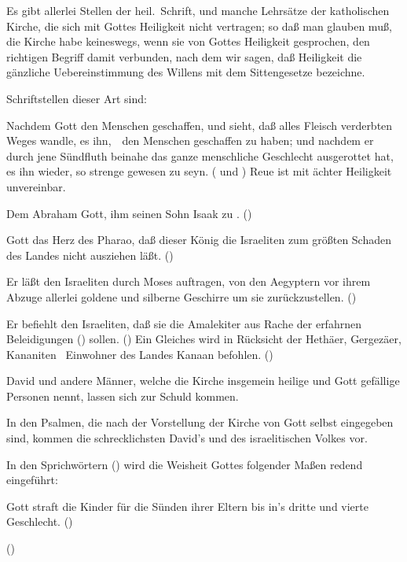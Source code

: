 Es gibt allerlei Stellen der heil.\ Schrift, und manche Lehrsätze der katholischen Kirche, die sich mit Gottes Heiligkeit nicht vertragen; so daß man glauben muß, die Kirche habe keineswegs, wenn sie von Gottes Heiligkeit gesprochen, den richtigen Begriff damit verbunden, nach dem wir sagen, daß Heiligkeit die gänzliche Uebereinstimmung des Willens mit dem Sittengesetze bezeichne.\par
Schriftstellen dieser Art sind:
\begin{aufzb}
\item Nachdem Gott den Menschen geschaffen, und sieht, daß alles Fleisch verderbten Weges wandle,  es ihn,~\ den Menschen geschaffen zu haben; und nachdem er durch jene Sündfluth beinahe das ganze menschliche Geschlecht ausgerottet hat,  es ihn wieder, so strenge gewesen zu seyn. ( und ) Reue ist mit ächter Heiligkeit unvereinbar.
\item Dem Abraham  Gott, ihm seinen Sohn Isaak zu . ()
\item Gott  das Herz des Pharao, daß dieser König die Israeliten zum größten Schaden des Landes nicht ausziehen läßt. ()
\item Er läßt den Israeliten durch Moses auftragen, von den Aegyptern vor ihrem Abzuge allerlei goldene und silberne Geschirre  um sie  zurückzustellen. ()
\item Er befiehlt den Israeliten, daß sie die Amalekiter aus Rache der erfahrnen Beleidigungen ()  sollen. () Ein Gleiches wird in Rücksicht der Hethäer, Gergezäer, Kananiten \ua\ Einwohner des Landes Kanaan befohlen. ()
\item David und andere Männer, welche die Kirche insgemein heilige und Gott gefällige Personen nennt, lassen sich  zur Schuld kommen.
\item In den Psalmen, die nach der Vorstellung der Kirche von Gott selbst eingegeben sind, kommen die schrecklichsten  David's und des israelitischen Volkes vor.
\item In den Sprichwörtern () wird die Weisheit Gottes folgender Maßen redend eingeführt: 
\item Gott straft die Kinder für die Sünden ihrer Eltern bis in's dritte und vierte Geschlecht. ()
\item {} ()
\end{aufzb}
